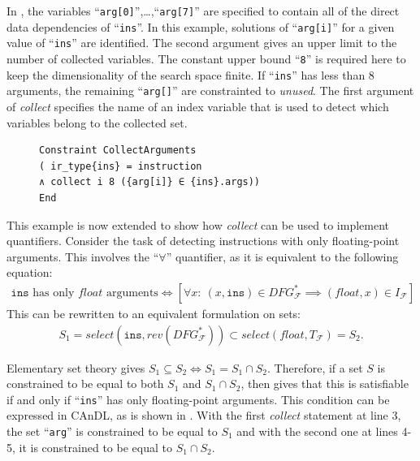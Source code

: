     \noindent
    In , the variables
    ``{\tt arg[0]}'',\dots,``{\tt arg[7]}''
    are specified to contain all of the direct data dependencies of
    ``{\tt ins}''.
    In this example, solutions of ``{\tt arg[i]}'' for a given value
    of ``{\tt ins}'' are identified.
    The second argument gives an upper limit to the number of collected
    variables.
    The constant upper bound ``\texttt{8}'' is required here to keep the
    dimensionality of the search space finite.
    If ``\texttt{ins}'' has less than 8 arguments, the remaining
    ``\texttt{arg[]}'' are constrainted to \textit{unused}.
    The first argument of {\it collect} specifies the name of an index
    variable that is used to detect which variables belong to the collected set.

\begin{figure}[t]
\vspace{3.6mm}
\begin{lstlisting}[language=CAnDL,label={fig:simplecollect},caption=
   {Simple {\it collect} example in CAnDL: Direct data dependencies of
    ``{\tt ins}'' are collected.\leftskip=0pt\rightskip=0pt}]
Constraint CollectArguments
( ir_type{ins} = instruction
∧ collect i 8 ({arg[i]} ∈ {ins}.args))
End
\end{lstlisting}
\end{figure}

    This example is now extended to show how {\it collect} can be used to
    implement quantifiers.
    Consider the task of detecting instructions with only floating-point
    arguments.
    This involves the ``$\forall$'' quantifier, as it is equivalent to
    the following equation:
    \begin{align}
        \texttt{ins}\text{ has only }\textit{float}\text{ arguments}\iff
        \left[\forall x\colon\ (x,\texttt{ins})\in DFG_\mathcal F^*\implies(\textit{float},x)\in I_\mathcal F\right]
        \label{fig:implication}
    \end{align}
    This can be rewritten to an equivalent formulation on sets:
    \begin{align*}
        S_1= \textit{select}(\texttt{ins},\textit{rev}(DFG_\mathcal F^*))\subset\textit{select}(\textit{float},T_\mathcal F)= S_2.
    \end{align*}
    
    Elementary set theory gives  $S_1\subseteq S_2\iff S_1 = S_1\cap S_2$.
    Therefore, if a set $S$ is constrained to be equal to both $S_1$ and
    $S_1\cap S_2$, then  gives that this is satisfiable if
    and only if ``{\tt ins}'' has only floating-point arguments.
    This condition can be expressed in CAnDL, as is shown in
    .
    With the first {\it collect} statement at line 3, the set ``{\tt arg}''
    is constrained to be equal to $S_1$ and with the second one at lines 4-5, it
    is constrained to be equal to $S_1\cap S_2$.

